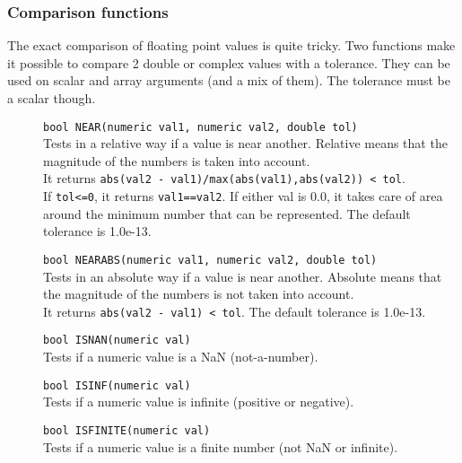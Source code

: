 \subsubsection{\label{TAQL:COMPARISONFUNCTIONS}Comparison functions}
The exact comparison of floating point values is quite tricky.
Two functions make it possible to compare 2 double or complex
values with a tolerance.
They can be used on scalar and array arguments (and a mix of them).
The tolerance must be a scalar though.
\begin{description}
  \item[] \texttt{bool NEAR(numeric val1, numeric val2, double tol)}\\
    Tests in a relative way if a value is near another. Relative
    means that the
    magnitude of the numbers is taken into account.
    \\It returns
    \texttt{abs(val2 - val1)/max(abs(val1),abs(val2)) < tol}.
    \\If \texttt{tol<=0}, it returns \texttt{val1==val2}.
    If either val is 0.0, it takes
    care of area around the minimum number that can be represented.
    The default tolerance is 1.0e-13.
  \item[] \texttt{bool NEARABS(numeric val1, numeric val2, double tol)}\\
    Tests in an absolute way if a value is near another. Absolute
    means that the
    magnitude of the numbers is not taken into account.
    \\It returns \texttt{abs(val2 - val1) < tol}.
    The default tolerance is 1.0e-13.
  \item[] \texttt{bool ISNAN(numeric val)}\\
    Tests if a numeric value is a NaN (not-a-number).
  \item[] \texttt{bool ISINF(numeric val)}\\
    Tests if a numeric value is infinite (positive or negative).
  \item[] \texttt{bool ISFINITE(numeric val)}\\
    Tests if a numeric value is a finite number (not NaN or infinite).
\end{description}

